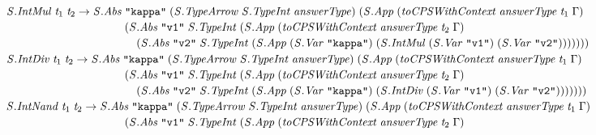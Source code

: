 \documentclass[10pt]{article}
\newcommand{\Conid}[1]{\mathit{#1}}
\newcommand{\Varid}[1]{\mathit{#1}}
\begin{document}
\begin{hscode}
${\hskip1.00em\relax\hskip1.00em\relax\Conid{\Conid{S}.IntMul}\;\Varid{t}_{1}\;\Varid{t}_{2}\to \Conid{\Conid{S}.Abs}\;\text{\tt \char34 kappa\char34}\;(\Conid{\Conid{S}.TypeArrow}\;\Conid{\Conid{S}.TypeInt}\;\Varid{answerType})\;(\Conid{\Conid{S}.App}\;(\Varid{toCPSWithContext}\;\Varid{answerType}\;\Varid{t}_{1}\;\Gamma)}$\\
${\hskip1.00em\relax\hskip1.00em\relax\hskip10.50em\relax(\Conid{\Conid{S}.Abs}\;\text{\tt \char34 v1\char34}\;\Conid{\Conid{S}.TypeInt}\;(\Conid{\Conid{S}.App}\;(\Varid{toCPSWithContext}\;\Varid{answerType}\;\Varid{t}_{2}\;\Gamma)}$\\
${\hskip1.00em\relax\hskip1.00em\relax\hskip10.50em\relax\hskip1.00em\relax(\Conid{\Conid{S}.Abs}\;\text{\tt \char34 v2\char34}\;\Conid{\Conid{S}.TypeInt}\;(\Conid{\Conid{S}.App}\;(\Conid{\Conid{S}.Var}\;\text{\tt \char34 kappa\char34})\;(\Conid{\Conid{S}.IntMul}\;(\Conid{\Conid{S}.Var}\;\text{\tt \char34 v1\char34})\;(\Conid{\Conid{S}.Var}\;\text{\tt \char34 v2\char34})))))))}$\\
${\hskip1.00em\relax\hskip1.00em\relax\Conid{\Conid{S}.IntDiv}\;\Varid{t}_{1}\;\Varid{t}_{2}\to \Conid{\Conid{S}.Abs}\;\text{\tt \char34 kappa\char34}\;(\Conid{\Conid{S}.TypeArrow}\;\Conid{\Conid{S}.TypeInt}\;\Varid{answerType})\;(\Conid{\Conid{S}.App}\;(\Varid{toCPSWithContext}\;\Varid{answerType}\;\Varid{t}_{1}\;\Gamma)}$\\
${\hskip1.00em\relax\hskip1.00em\relax\hskip10.50em\relax(\Conid{\Conid{S}.Abs}\;\text{\tt \char34 v1\char34}\;\Conid{\Conid{S}.TypeInt}\;(\Conid{\Conid{S}.App}\;(\Varid{toCPSWithContext}\;\Varid{answerType}\;\Varid{t}_{2}\;\Gamma)}$\\
${\hskip1.00em\relax\hskip1.00em\relax\hskip10.50em\relax\hskip1.00em\relax(\Conid{\Conid{S}.Abs}\;\text{\tt \char34 v2\char34}\;\Conid{\Conid{S}.TypeInt}\;(\Conid{\Conid{S}.App}\;(\Conid{\Conid{S}.Var}\;\text{\tt \char34 kappa\char34})\;(\Conid{\Conid{S}.IntDiv}\;(\Conid{\Conid{S}.Var}\;\text{\tt \char34 v1\char34})\;(\Conid{\Conid{S}.Var}\;\text{\tt \char34 v2\char34})))))))}$\\
${\hskip1.00em\relax\hskip1.00em\relax\Conid{\Conid{S}.IntNand}\;\Varid{t}_{1}\;\Varid{t}_{2}\to \Conid{\Conid{S}.Abs}\;\text{\tt \char34 kappa\char34}\;(\Conid{\Conid{S}.TypeArrow}\;\Conid{\Conid{S}.TypeInt}\;\Varid{answerType})\;(\Conid{\Conid{S}.App}\;(\Varid{toCPSWithContext}\;\Varid{answerType}\;\Varid{t}_{1}\;\Gamma)}$\\
${\hskip1.00em\relax\hskip1.00em\relax\hskip10.50em\relax(\Conid{\Conid{S}.Abs}\;\text{\tt \char34 v1\char34}\;\Conid{\Conid{S}.TypeInt}\;(\Conid{\Conid{S}.App}\;(\Varid{toCPSWithContext}\;\Varid{answerType}\;\Varid{t}_{2}\;\Gamma)}$\\

\end{hscode}
\end{document}
